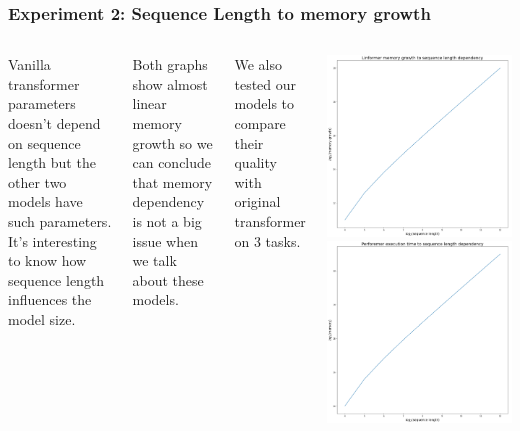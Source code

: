 \documentclass[9pt]{beamer}%
\begin{document}
\begin{frame}
	\frametitle{Experiment 2: Sequence Length to memory growth}
	
	\begin{columns}
		Vanilla transformer parameters doesn't depend on sequence length but the other two models have such parameters. It's interesting to know how sequence length influences the model size.
		
		Both graphs show almost linear memory growth so we can conclude that memory dependency is not a big issue when we talk about these models. 
		
		We also tested our models to compare their quality with original transformer on 3 tasks.
		
		\includegraphics[scale=0.08]{linformer_seq_len_to_memory_growth}
		\includegraphics[scale=0.08]{performer_seq_len_to_memory_growth}

\end{columns}
\end{frame}
\end{document}
